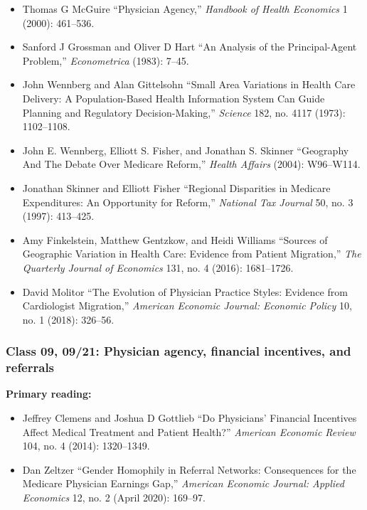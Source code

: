 \documentclass[11pt,]{article}
\providecommand{\tightlist}{%
  \setlength{\itemsep}{0pt}\setlength{\parskip}{0pt}}
\begin{document}
\begin{itemize}
\tightlist
\item
  Thomas G McGuire {``Physician Agency,''} \emph{Handbook of Health
  Economics} 1 (2000): 461--536.
\item
  Sanford J Grossman and Oliver D Hart {``An Analysis of the
  Principal-Agent Problem,''} \emph{Econometrica} (1983): 7--45.
\item
  John Wennberg and Alan Gittelsohn {``Small Area Variations in Health
  Care Delivery: A Population-Based Health Information System Can Guide
  Planning and Regulatory Decision-Making,''} \emph{Science} 182, no.
  4117 (1973): 1102--1108.
\item
  John E. Wennberg, Elliott S. Fisher, and Jonathan S. Skinner
  {``Geography {And} {The} {Debate} {Over} {Medicare} {Reform},''}
  \emph{Health Affairs} (2004): W96--W114.
\item
  Jonathan Skinner and Elliott Fisher {``Regional Disparities in
  {Medicare} Expenditures: An Opportunity for Reform,''} \emph{National
  Tax Journal} 50, no. 3 (1997): 413--425.
\item
  Amy Finkelstein, Matthew Gentzkow, and Heidi Williams {``Sources of
  Geographic Variation in Health Care: {Evidence} from Patient
  Migration,''} \emph{The Quarterly Journal of Economics} 131, no. 4
  (2016): 1681--1726.
\item
  David Molitor {``The Evolution of Physician Practice Styles: Evidence
  from Cardiologist Migration,''} \emph{American Economic Journal:
  Economic Policy} 10, no. 1 (2018): 326--56.
\end{itemize}

\hypertarget{class-09-0921-physician-agency-financial-incentives-and-referrals}{%
\subsubsection{Class 09, 09/21: Physician agency, financial incentives,
and
referrals}\label{class-09-0921-physician-agency-financial-incentives-and-referrals}}

\textbf{Primary reading:}

\begin{itemize}
\tightlist
\item
  Jeffrey Clemens and Joshua D Gottlieb {``Do {Physicians}' {Financial}
  {Incentives} {Affect} {Medical} {Treatment} and {Patient} {Health}?''}
  \emph{American Economic Review} 104, no. 4 (2014): 1320--1349.
\item
  Dan Zeltzer {``Gender {Homophily} in {Referral} {Networks}:
  {Consequences} for the {Medicare} {Physician} {Earnings} {Gap},''}
  \emph{American Economic Journal: Applied Economics} 12, no. 2 (April
  2020): 169--97.
\end{itemize}
\end{document}
